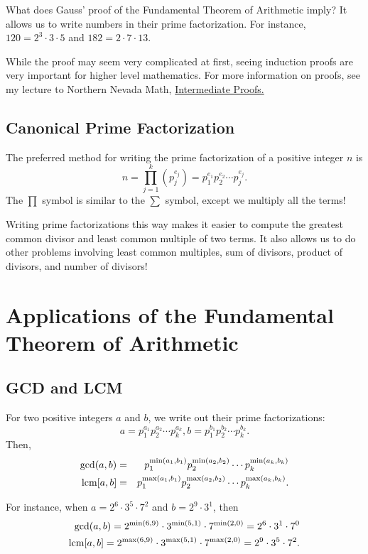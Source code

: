 What does Gauss' proof of the Fundamental Theorem of Arithmetic imply? It allows us to write numbers in their prime factorization. For instance, $120=2^3\cdot 3\cdot 5$ and $182=2\cdot 7\cdot 13$. 

While the proof may seem very complicated at first, seeing induction proofs are very important for higher level mathematics. For more information on proofs, see my lecture to Northern Nevada Math, \color{Orange}\href{https://numbertheoryguydotcom.files.wordpress.com/2016/03/intermediateproofs.pdf}{Intermediate Proofs.}

\clearpage

\subsection{Canonical Prime Factorization}

\color{black} The preferred method for writing the prime factorization of a positive integer $n$ is $$n=\prod_{j=1}^{k}\left(p_j^{e_j}\right)=p_1^{e_1}p_2^{e_2}\cdots p_j^{e_j}.$$ 
The $\prod$ symbol is similar to the $\sum$ symbol, except we multiply all the terms!

Writing prime factorizations this way makes it easier to compute the greatest common divisor and least common multiple of two terms. It also allows us to do other problems involving least common multiples, sum of divisors, product of divisors, and number of divisors!  

\section{Applications of the Fundamental Theorem of Arithmetic}

\subsection{GCD and LCM}

For two positive integers $a$ and $b$, we write out their prime factorizations: $$a=p_1^{a_1}p_2^{a_2}\cdots p_k^{a_k}, b=p_1^{b_1}p_2^{b_2}\cdots p_k^{b_k}.$$ Then, \begin{eqnarray*} \gcd(a,b)&=&p_1^{\min(a_1, b_1)}p_2^{\min(a_2, b_2)}\cdots p_k^{\min(a_k, b_k)} \\ \operatorname{lcm}[a,b]&=&p_1^{\max(a_1, b_1)}p_2^{\max(a_2, b_2)}\cdots p_k^{\max(a_k, b_k)}. \end{eqnarray*}
\clearpage

For instance, when $a=2^6\cdot 3^5\cdot 7^2$ and $b=2^9\cdot 3^1$, then \begin{eqnarray*} \gcd(a,b)=2^{\min(6,9)}\cdot 3^{\min(5,1)}\cdot 7^{\min(2,0)}=2^6\cdot 3^1\cdot 7^0 \\ \operatorname{lcm}[a,b]=2^{\max(6,9)}\cdot 3^{\max(5,1)}\cdot 7^{\max(2,0)}=2^9\cdot 3^5\cdot 7^2. \end{eqnarray*}

